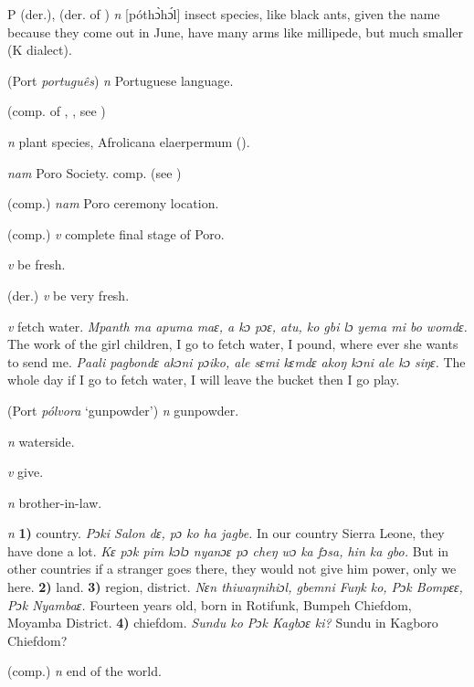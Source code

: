 \begin{letter}{P}
 (der.), (der. of ) \textit{n} [póthɔ̀hɔ́l] insect species, like black ants, given the name because they come out in June, have many arms like millipede, but much smaller (K dialect). 

 (Port \textit{português}) \textit{n} Portuguese language.

 (comp. of , , see )

 \textit{n} plant species, Afrolicana elaerpermum (\citealt{Pichl1967}). 

 \textit{nam} Poro Society. comp.  (see ) 

 (comp.) \textit{nam} Poro ceremony location.

 (comp.) \textit{v} complete final stage of Poro.

 \textit{v} be fresh.

 (der.) \textit{v} be very fresh.

 \textit{v} fetch water. \textit{Mpanth ma apuma maɛ, a kɔ pɔɛ, atu, ko gbi lɔ yema mi bo womdɛ.} The work of the girl children, I go to fetch water, I pound, where ever she wants to send me. \textit{Paali pagbondɛ akɔni pɔiko, ale sɛmi kɛmdɛ akoŋ kɔni ale kɔ siŋɛ.} The whole day if I go to fetch water, I will leave the bucket then I go play.

 (Port \textit{pólvora} ‘gunpowder') \textit{n} gunpowder.

 \textit{n} waterside.

 \textit{v} give.

 \textit{n} brother-in-law.

 \textit{n} \textbf{1)} country. \textit{Pɔki Salon dɛ, pɔ ko ha jagbe.} In our country Sierra Leone, they have done a lot. \textit{Kɛ pɔk pim kɔlɔ nyanɔɛ pɔ cheŋ wɔ ka fɔsa, hin ka gbo.} But in other countries if a stranger goes there, they would not give him power, only we here. \textbf{2)} land. \textbf{3)} region, district. \textit{Nɛn thiwaŋnihiɔl, gbemni Fuŋk ko, Pɔk Bompɛɛ, Pɔk Nyambaɛ.} Fourteen years old, born in Rotifunk, Bumpeh Chiefdom, Moyamba District. \textbf{4)} chiefdom. \textit{Sundu ko Pɔk Kagbɔɛ ki?} Sundu in Kagboro Chiefdom?

 (comp.) \textit{n} end of the world.


\end{letter}
